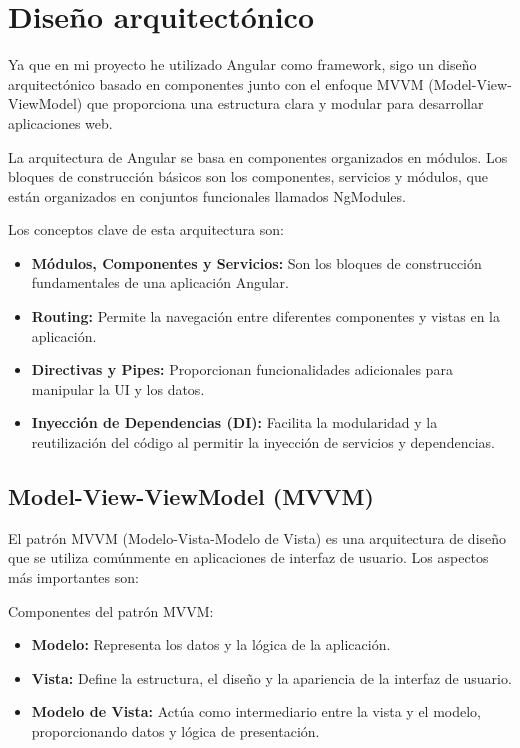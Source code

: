 \clearpage

\section{Diseño arquitectónico}

Ya que en mi proyecto he utilizado Angular como framework, sigo un diseño arquitectónico basado en componentes junto con el enfoque MVVM (Model-View-ViewModel) que proporciona una estructura clara y modular para desarrollar aplicaciones web.

La arquitectura de Angular \cite{patron} se basa en componentes organizados en módulos. Los bloques de construcción básicos son los componentes, servicios y módulos, que están organizados en conjuntos funcionales llamados NgModules.

Los conceptos clave de esta arquitectura son:
\begin{itemize}
\tightlist
    \item \textbf{Módulos, Componentes y Servicios:} Son los bloques de construcción fundamentales de una aplicación Angular.
    \item \textbf{Routing:} Permite la navegación entre diferentes componentes y vistas en la aplicación.
    \item \textbf{Directivas y Pipes:} Proporcionan funcionalidades adicionales para manipular la UI y los datos.
    \item \textbf{Inyección de Dependencias (DI):} Facilita la modularidad y la reutilización del código al permitir la inyección de servicios y dependencias.
\end{itemize}

\hfill

\subsection{Model-View-ViewModel (MVVM)}

El patrón MVVM (Modelo-Vista-Modelo de Vista) \cite{mvvm} es una arquitectura de diseño que se utiliza comúnmente en aplicaciones de interfaz de usuario. Los aspectos más importantes son:

Componentes del patrón MVVM:
\begin{itemize}
\tightlist
    \item \textbf{Modelo:} Representa los datos y la lógica de la aplicación.
    \item \textbf{Vista:} Define la estructura, el diseño y la apariencia de la interfaz de usuario.
    \item \textbf{Modelo de Vista:} Actúa como intermediario entre la vista y el modelo, proporcionando datos y lógica de presentación.
\end{itemize}

